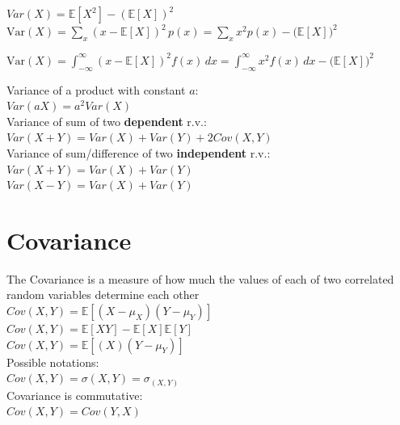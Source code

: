$Var\left(X\right)=\mathbb{E}\left[X^2\right]-\left(\mathbb{E}\left[X\right]\right)^2$\\

$\mathrm{Var}(X) = \sum_{x} (x - \mathbb{E}[X])^2 \, p(x)
= \sum_{x} x^2 p(x) - \big(\mathbb{E}[X]\big)^2$

$\mathrm{Var}(X) = \int_{-\infty}^{\infty} (x - \mathbb{E}[X])^2 f(x)\,dx
= \int_{-\infty}^{\infty} x^2 f(x)\,dx - \big(\mathbb{E}[X]\big)^2$

Variance of a product with constant $a$:\\

$Var(aX)=a^2 Var\left(X\right)$\\

Variance of sum of two \textbf{dependent} r.v.:\\

$Var(X + Y)=Var(X)+Var(Y)+2Cov(X,Y)$\\

Variance of sum/difference of two \textbf{independent} r.v.:\\

$Var(X + Y)=Var(X)+Var(Y)$\\

$Var(X - Y)=Var(X)+Var(Y)$\\

\section{Covariance}

The Covariance is a measure of how much the values of each of two correlated random variables determine each other\\

$Cov(X,Y) = \mathbb E[(X - \mu _ X)(Y - \mu _ Y)]$ \\

$Cov(X,Y) = \mathbb E[XY] - \mathbb E[X]\mathbb E[Y] $\\

$ Cov(X,Y)= \displaystyle  \mathbb E[(X)(Y-\mu _ Y)]$\\

Possible notations:\\

$Cov(X,Y) = \sigma(X,Y) = \sigma_ {(X,Y)}$\\

Covariance is commutative:\\

$Cov(X,Y) = Cov(Y,X)$\\


